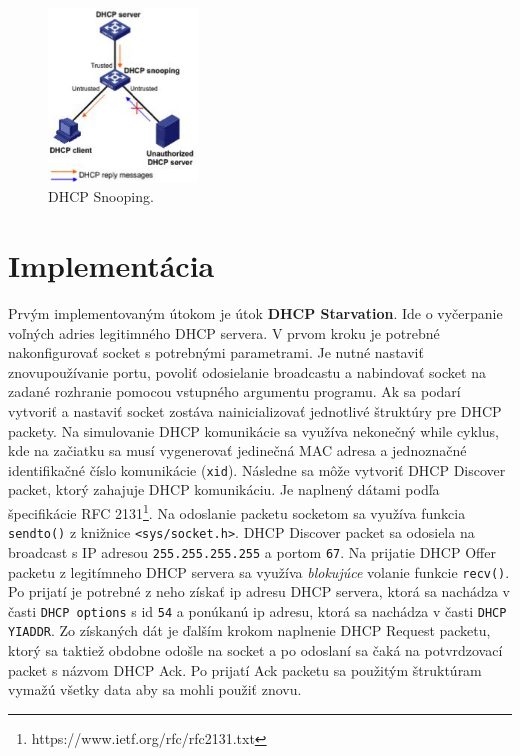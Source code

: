 \documentclass{article}
\begin{document}
\begin{figure}[h]
    \centering
    \includegraphics[width=150px]{pic/dhcpsnooping.jpg}
    \caption{DHCP Snooping.}
    \label{fig:dhcp_snooping}
\end{figure}

\section{Implementácia}
Prvým implementovaným útokom je útok \textbf{DHCP Starvation}. Ide o vyčerpanie voľných adries legitimného DHCP servera. V prvom kroku je potrebné nakonfigurovať socket s potrebnými parametrami. Je nutné nastaviť znovupoužívanie portu, povoliť odosielanie broadcastu a nabindovať socket na zadané rozhranie pomocou vstupného argumentu programu. Ak sa podarí vytvoriť a nastaviť socket zostáva nainicializovať jednotlivé štruktúry pre DHCP packety. Na simulovanie DHCP komunikácie sa využíva nekonečný while cyklus, kde na začiatku sa musí vygenerovať jedinečná MAC adresa a jednoznačné identifikačné číslo komunikácie (\texttt{xid}). Následne sa môže vytvoriť DHCP Discover packet, ktorý zahajuje DHCP komunikáciu. Je naplnený dátami podľa špecifikácie RFC 2131\footnote{https://www.ietf.org/rfc/rfc2131.txt}. Na odoslanie packetu socketom sa využíva funkcia \texttt{sendto()} z knižnice \texttt{<sys/socket.h>}. DHCP Discover packet sa odosiela na broadcast s IP adresou \texttt{255.255.255.255} a portom \texttt{67}. Na prijatie DHCP Offer packetu z legitímneho DHCP servera sa využíva \textit{blokujúce} volanie funkcie \texttt{recv()}. Po prijatí je potrebné z neho získať ip adresu DHCP servera, ktorá sa nachádza v časti \texttt{DHCP options} s id \texttt{54} a ponúkanú ip adresu, ktorá sa nachádza v časti \texttt{DHCP YIADDR}. Zo získaných dát je ďalším krokom naplnenie DHCP Request packetu, ktorý sa taktiež obdobne odošle na socket a po odoslaní sa čaká na potvrdzovací packet s názvom DHCP Ack. Po prijatí Ack packetu sa použitým štruktúram vymažú všetky data aby sa mohli použiť znovu.
\end{document}
